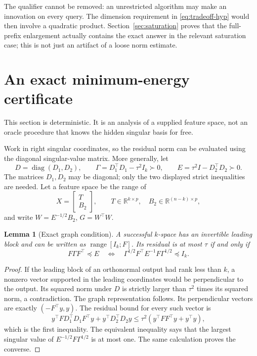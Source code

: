 \documentclass[11pt]{article}
\newtheorem{lemma}[theorem]{Lemma}
\theoremstyle{definition}
\newcommand{\R}{\mathbb R}
\newcommand{\ran}{\operatorname{range}}
\newcommand{\diag}{\operatorname{diag}}
\begin{document}
The qualifier cannot be removed: an unrestricted algorithm may make an innovation on every query. The dimension requirement in \eqref{eq:tradeoff-hyp} would then involve a quadratic product. Section~\ref{sec:saturation} proves that the full-prefix enlargement actually contains the exact answer in the relevant saturation case; this is not just an artifact of a loose norm estimate.

\section{An exact minimum-energy certificate}\label{sec:certificate}
This section is deterministic. It is an analysis of a supplied feature space, not an oracle procedure that knows the hidden singular basis for free.

Work in right singular coordinates, so the residual norm can be evaluated using the diagonal singular-value matrix. More generally, let
\[
 D=\diag(D_1,D_2),\qquad
 \Gamma=D_1^\top D_1-\tau^2 I_k\succ0,\qquad
 E=\tau^2 I-D_2^\top D_2\succ0.
\]
The matrices $D_1,D_2$ may be diagonal; only the two displayed strict inequalities are needed. Let a feature space be the range of
\[
 X=\begin{bmatrix}T\\ B_2\end{bmatrix},\qquad
 T\in\R^{k\times p},\quad B_2\in\R^{(n-k)\times p},
\]
and write $W=E^{-1/2}B_2$, $G=W^\top W$.

\begin{lemma}[Exact graph condition]\label{lem:graph}
A successful $k$-space has an invertible leading block and can be written as $\ran[I_k;F]$. Its residual is at most $\tau$ if and only if
\begin{equation}\label{eq:graph}
 F\Gamma F^\top\preceq E
 \quad\Longleftrightarrow\quad
 \Gamma^{1/2}F^\top E^{-1}F\Gamma^{1/2}\preceq I_k.
\end{equation}
\end{lemma}
\begin{proof}
If the leading block of an orthonormal output had rank less than $k$, a nonzero vector supported in the leading coordinates would be perpendicular to the output. Its squared norm under $D$ is strictly larger than $\tau^2$ times its squared norm, a contradiction. The graph representation follows. Its perpendicular vectors are exactly $(-F^\top y,y)$. The residual bound for every such vector is
\[
 y^\top F D_1^\top D_1F^\top y+y^\top D_2^\top D_2y
 \le\tau^2(y^\top FF^\top y+y^\top y),
\]
which is the first inequality. The equivalent inequality says that the largest singular value of $E^{-1/2}F\Gamma^{1/2}$ is at most one. The same calculation proves the converse.
\end{proof}
\end{document}
